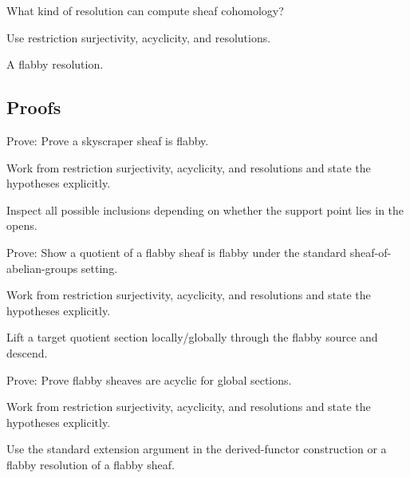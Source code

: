 \begin{exercise}[Resolution]\label{exr:vi46-expand-05}
What kind of resolution can compute sheaf cohomology?
\end{exercise}
\begin{hint}
Use restriction surjectivity, acyclicity, and resolutions.
\end{hint}
\begin{solution}
A flabby resolution.
\end{solution}

\subsection*{Proofs}

\begin{exercise}\label{exr:vi46-expand-06}
Prove: Prove a skyscraper sheaf is flabby.
\end{exercise}
\begin{hint}
Work from restriction surjectivity, acyclicity, and resolutions and state the hypotheses explicitly.
\end{hint}
\begin{solution}
Inspect all possible inclusions depending on whether the support point lies in the opens.
\end{solution}

\begin{exercise}\label{exr:vi46-expand-07}
Prove: Show a quotient of a flabby sheaf is flabby under the standard sheaf-of-abelian-groups setting.
\end{exercise}
\begin{hint}
Work from restriction surjectivity, acyclicity, and resolutions and state the hypotheses explicitly.
\end{hint}
\begin{solution}
Lift a target quotient section locally/globally through the flabby source and descend.
\end{solution}

\begin{exercise}[Acyclicity]\label{exr:vi46-expand-08}
Prove: Prove flabby sheaves are acyclic for global sections.
\end{exercise}
\begin{hint}
Work from restriction surjectivity, acyclicity, and resolutions and state the hypotheses explicitly.
\end{hint}
\begin{solution}
Use the standard extension argument in the derived-functor construction or a flabby resolution of a flabby sheaf.
\end{solution}

